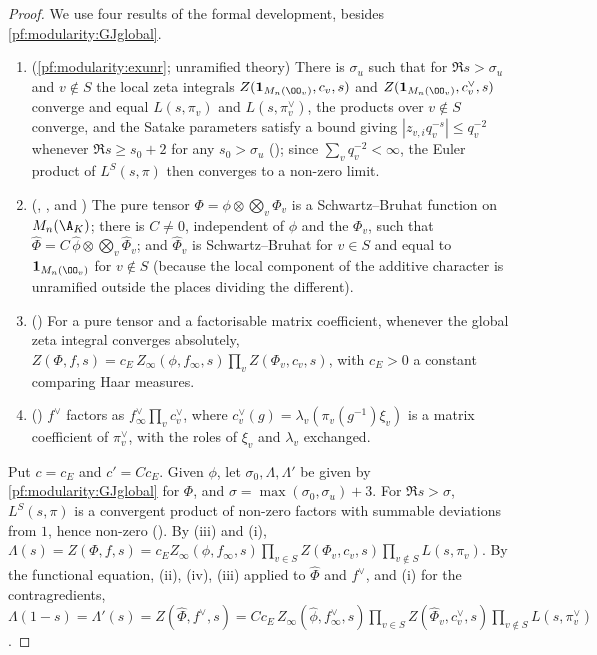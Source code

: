 \begin{proof}
We use four results of the formal development, besides \cref{pf:modularity:GJglobal}.
\begin{enumerate}[label=(\roman*)]
\item (\cref{pf:modularity:exunr}; unramified theory) There is $\sigma_u$ such
that for $\Re s>\sigma_u$ and $v\notin S$ the local zeta integrals $Z(\mathbf 1_{M_n(\OO_v)},c_v,s)$ and
$Z(\mathbf 1_{M_n(\OO_v)},c_v^\vee,s)$ converge and equal $L(s,\pi_v)$ and $L(s,\pi_v^\vee)$, the products over
$v\notin S$ converge, and the Satake parameters satisfy a bound giving $|z_{v,i}q_v^{-s}|\le q_v^{-2}$ whenever
$\Re s\ge s_0+2$ for any $s_0>\sigma_u$ (); since
$\sum_vq_v^{-2}<\infty$, the Euler product of $L^S(s,\pi)$ then converges to a non-zero limit.
\item (, , and )
The pure tensor $\Phi=\phi\otimes\bigotimes_v\Phi_v$ is a Schwartz--Bruhat function on $M_n(\A_K)$; there is $C\ne0$,
independent of $\phi$ and the $\Phi_v$, such that $\widehat\Phi=C\,\widehat\phi\otimes\bigotimes_v\widehat\Phi_v$; and
$\widehat\Phi_v$ is Schwartz--Bruhat for $v\in S$ and equal to $\mathbf 1_{M_n(\OO_v)}$ for $v\notin S$ (because the local
component of the additive character is unramified outside the places dividing the different).
\item () For a pure tensor and a factorisable
matrix coefficient, whenever the global zeta integral converges absolutely,
$Z(\Phi,f,s)=c_E\,Z_\infty(\phi,f_\infty,s)\prod_vZ(\Phi_v,c_v,s)$, with $c_E>0$ a constant comparing Haar measures.
\item () $f^\vee$ factors as
$f_\infty^\vee\prod_vc_v^\vee$, where $c_v^\vee(g)=\lambda_v(\pi_v(g^{-1})\xi_v)$ is a matrix coefficient of
$\pi_v^\vee$, with the roles of $\xi_v$ and $\lambda_v$ exchanged.
\end{enumerate}
Put $c=c_E$ and $c'=Cc_E$. Given $\phi$, let $\sigma_0,\Lambda,\Lambda'$ be given by \cref{pf:modularity:GJglobal} for
$\Phi$, and $\sigma=\max(\sigma_0,\sigma_u)+3$. For $\Re s>\sigma$, $L^S(s,\pi)$ is a convergent product of non-zero
factors with summable deviations from $1$, hence non-zero
(). By (iii) and (i),
$\Lambda(s)=Z(\Phi,f,s)=c_EZ_\infty(\phi,f_\infty,s)\prod_{v\in S}Z(\Phi_v,c_v,s)\prod_{v\notin S}L(s,\pi_v)$. By the
functional equation, (ii), (iv), (iii) applied to $\widehat\Phi$ and $f^\vee$, and (i) for the contragredients,
$\Lambda(1-s)=\Lambda'(s)=Z(\widehat\Phi,f^\vee,s)=Cc_E\,Z_\infty(\widehat\phi,f_\infty^\vee,s)\prod_{v\in S}
Z(\widehat\Phi_v,c_v^\vee,s)\prod_{v\notin S}L(s,\pi_v^\vee)$.
\end{proof}

